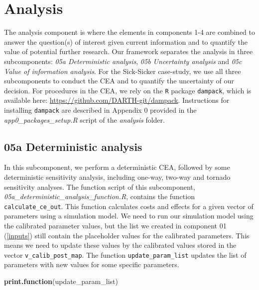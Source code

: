 \documentclass[]{book}
\newenvironment{Shaded}{\begin{snugshade}}{\end{snugshade}}
\newcommand{\KeywordTok}[1]{\textcolor[rgb]{0.13,0.29,0.53}{\textbf{#1}}}
\newcommand{\NormalTok}[1]{#1}
\begin{document}
\hypertarget{analysis}{%
\chapter{Analysis}\label{analysis}}

The analysis component is where the elements in components 1-4 are combined to answer the question(s) of interest given current information and to quantify the value of potential further research. Our framework separates the analysis in three subcomponents: \emph{05a Deterministic analysis}, \emph{05b Uncertainty analysis} and \emph{05c Value of information analysis}. For the Sick-Sicker case-study, we use all three subcomponents to conduct the CEA and to quantify the uncertainty of our decision. For procedures in the CEA, we rely on the \texttt{R} package \texttt{dampack}, which is available here: \url{https://github.com/DARTH-git/dampack}. Instructions for installing \texttt{dampack} are described in Appendix 0 provided in the \emph{app0\_packages\_setup.R} script of the \emph{analysis} folder.

\hypertarget{Deterministic-analysis}{%
\section{05a Deterministic analysis}\label{Deterministic-analysis}}

In this subcomponent, we perform a deterministic CEA, followed by some deterministic sensitivity analysis, including one-way, two-way and tornado sensitivity analyses. The function script of this subcomponent, \emph{05a\_deterministic\_analysis\_function.R}, contains the function \texttt{calculate\_ce\_out}. This function calculates costs and effects for a given vector of parameters using a simulation model. We need to run our simulation model using the calibrated parameter values, but the list we created in component 01 (\ref{inputs}) still contain the placeholder values for the calibrated parameters. This means we need to update these values by the calibrated values stored in the vector \texttt{v\_calib\_post\_map}. The function \texttt{update\_param\_list} updates the list of parameters with new values for some specific parameters.

\begin{Shaded}
\begin{Highlighting}[]
\KeywordTok{print.function}\NormalTok{(update_param_list)}
\end{Highlighting}
\end{Shaded}
\end{document}

